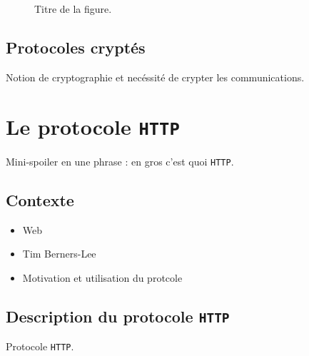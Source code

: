 \documentclass[a4paper,11pt]{article}
\begin{document}
\begin{figure}[!h]
\begin{center}
  \caption{Titre de la figure.}
  \label{etiquette_de_la_figure_pour_y_faire_reference_plus_tard}
\end{center}
\end{figure}


\subsection{Protocoles cryptés}

Notion de cryptographie et necéssité de crypter les communications.


\section{Le protocole {\tt HTTP}}

Mini-spoiler en une phrase : en gros c'est quoi {\tt HTTP}.

\subsection{Contexte}

\begin{itemize}
\item Web
\item Tim Berners-Lee
\item Motivation et utilisation du protcole
\end{itemize}

\subsection{Description du protocole {\tt HTTP}}

\begin{center}
\begin{algorithm}
\caption{Protocole {\tt HTTP}.}
\label{etiquette_de_l_algo_pour_y_faire_reference_plus_tard}
\end{algorithm}
\end{center}


\end{document}
